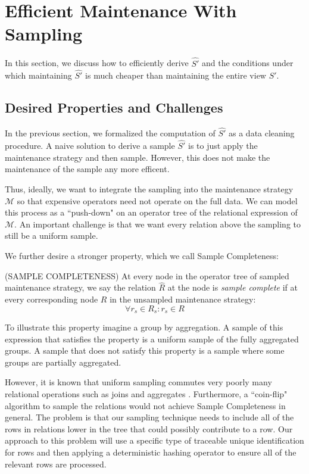 \section{Efficient Maintenance With Sampling}
In this section, we discuss how to efficiently derive $\hat{S'}$ and the conditions under which
maintaining $\hat{S'}$ is much cheaper than maintaining the entire view $S'$.

\subsection{Desired Properties and Challenges}
In the previous section, we formalized the computation of $\hat{S'}$  as a data cleaning procedure.
A naive solution to derive a sample $\hat{S'}$ is to just apply the maintenance strategy and then sample.
However, this does not make the maintenance of the sample any more efficent.

Thus, ideally, we want to integrate the sampling into the maintenance strategy $\mathcal{M}$ so that expensive operators
need not operate on the full data.
We can model this process as a ``push-down" on an operator tree of the relational expression of $\mathcal{M}$.
An important challenge is that we want every relation above the sampling to still be a uniform sample.

We further desire a stronger property, which we call Sample Completeness:
\begin{definition} (SAMPLE COMPLETENESS) At every node in the operator tree of sampled maintenance strategy, we say the relation $\hat{R}$ at the node is \emph{sample complete} if at every corresponding node $R$ in the unsampled maintenance strategy:
\[ \forall r_s \in R_s : r_s \in R \]
\end{definition}
To illustrate this property imagine a group by aggregation.
A sample of this expression that satisfies the property is a uniform sample of the fully aggregated groups.
A sample that does not satisfy this property is a sample where some groups are partially aggregated.

However, it is known that uniform sampling commutes very poorly many relational operations such as joins and aggregates \cite{chaudhuri1999random}.
Furthermore, a ``coin-flip" algorithm to sample the relations would not achieve Sample Completeness in general.
The problem is that our sampling technique needs to include all of the rows in relations lower in the tree that could possibly contribute to a row.
Our approach to this problem will use a specific type of traceable unique identification for rows and then applying a deterministic hashing operator to ensure all of the relevant rows are processed.

